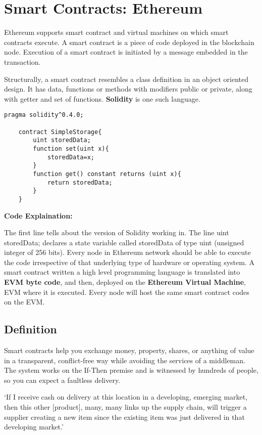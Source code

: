\documentclass{article}
\begin{document}
\section{Smart Contracts: Ethereum}
Ethereum supports smart contract and virtual machines on which smart contracts execute.
A smart contract is a piece of code deployed in the blockchain node. Execution of a smart contract is initiated by a message embedded in the transaction. \par
Structurally, a smart contract resembles a class definition in an object oriented design. It has data, functions or methods with modifiers public or private, along with getter and set of functions. \textbf{Solidity} is one such language.
\par
\begin{lstlisting}[language=Solidity]
    pragma solidity^0.4.0;
    
    contract SimpleStorage{
        uint storedData;
        function set(uint x){
            storedData=x;
        }
        function get() constant returns (uint x){
            return storedData;
        }
    }
\end{lstlisting}
\textbf{Code Explaination:}
\par The first line tells about the version of Solidity working in. The line uint storedData; declares a state variable called storedData of type uint (unsigned integer of 256 bits). 
Every node in Ethereum network should be able to execute the code irrespective of that underlying type of hardware or operating system. A smart contract written a high level programming language is translated into \textbf{EVM byte code}, and then, deployed on the \textbf{Ethereum Virtual Machine}, EVM where it is executed. Every node will host the same smart contract codes on the EVM. 
\subsection{Definition}
Smart contracts help you exchange money, property, shares, or anything of value in a transparent, conflict-free way while avoiding the services of a middleman. The system works on the If-Then premise and is witnessed by hundreds of people, so you can expect a faultless delivery. \par
‘If I receive cash on delivery at this location in a developing, emerging market, then this other [product], many, many links up the supply chain, will trigger a supplier creating a new item since the existing item was just delivered in that developing market.’
\end{document}
